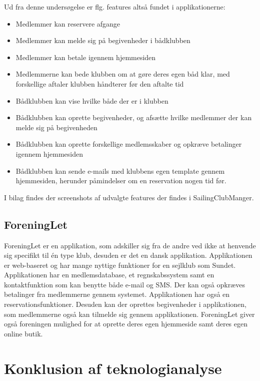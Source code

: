 Ud fra denne undersøgelse er flg. features altså fundet i applikationerne:

\begin{itemize}
  \item Medlemmer kan reservere afgange
  \item Medlemmer kan melde sig på begivenheder i bådklubben
  \item Medlemmer kan betale igennem hjemmesiden
  \item Medlemmerne kan bede klubben om at gøre deres egen båd klar, med forskellige aftaler klubben håndterer
        før den aftalte tid
  \item Bådklubben kan vise hvilke både der er i klubben
  \item Bådklubben kan oprette begivenheder, og afsætte hvilke medlemmer der kan melde sig på begivenheden
  \item Bådklubben kan oprette forskellige medlemsskaber og opkræve betalinger igennem hjemmesiden
  \item Bådklubben kan sende e-mails med klubbens egen template gennem hjemmesiden, herunder påmindelser om en
        reservation nogen tid før.
\end{itemize}

I bilag  findes der screenshots af udvalgte features der findes i SailingClubManger.

\subsection*{ForeningLet}

ForeningLet er en applikation, som adskiller sig fra de andre ved ikke at henvende sig specifikt til én type klub, desuden er det en dansk applikation. Applikationen er web-baseret og har mange nyttige funktioner for en sejlklub som Sundet. Applikationen har en medlemsdatabase, et regnskabssystem samt en kontaktfunktion som kan benytte både e-mail og SMS. Der kan også opkræves betalinger fra medlemmerne gennem systemet. Applikationen har også en reservationsfunktioner. Desuden kan der oprettes begivenheder i applikationen, som medlemmerne også kan tilmelde sig gennem applikationen. ForeningLet giver også foreningen mulighed for at oprette deres egen hjemmeside samt deres egen online butik. 


\section{Konklusion af teknologianalyse}

